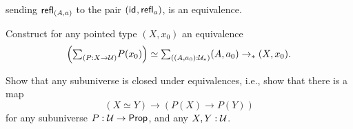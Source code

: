 \begin{exercises}
\begin{subexenum}
\begin{equation*}
    \end{equation*}
    sending $\mathsf{refl}_{(A,a)}$ to the pair $(\mathsf{id}_{},\mathsf{refl}_{a})$, is an equivalence.
  \item Construct for any pointed type $(X,x_0)$ an equivalence
    \begin{equation*}
      \Big(\sm{P:X\to \UU}P(x_0)\Big)\simeq \sm{(A,a_0):\UU_\ast}(A,a_0)\to_\ast(X,x_0).
    \end{equation*}
  \end{subexenum}
\item Show that any subuniverse is closed under equivalences, i.e., show that there is a map
  \begin{equation*}
    (X\simeq Y) \to (P(X)\to P(Y))
  \end{equation*}
  for any subuniverse $P:\mathcal{U}\to\mathsf{Prop}$, and any $X,Y:\mathcal{U}$. 
\end{exercises}
